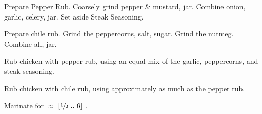 \begin{preparation}
\item Prepare Pepper Rub.
    Coarsely grind pepper \& mustard, jar.
    Combine onion, garlic, celery, jar.
    Set aside Steak Seasoning.
\item Prepare chile rub.
    Grind the peppercorns, salt, sugar.
    Grind the nutmeg.
    Combine all, jar.
\item Rub chicken with pepper rub,
    using an equal mix of the garlic, peppercorns, and steak seasoning.
\item Rub chicken with chile rub,
    using approximately as much as the pepper rub.
\item Marinate for $\approx$ $[\sfrac{1}{2}~..~6]$ \hour.
\end{preparation}

\recipeend%
